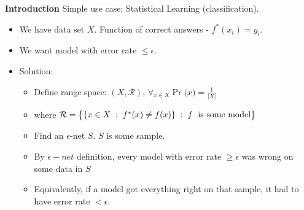 \documentclass{beamer}
\begin{document}
\begin{frame}{\textbf{Introduction}}
  Simple use case: Statistical Learning (classification).
  \begin{itemize}
    \item We have data set $X$. Function of correct answers - $f^*(x_i)=y_i$.
    \item We want model with error rate $\leq\epsilon$.
    \item Solution:
    \begin{itemize}
        \item Define range space: \( (X,\mathcal{R}) \), $\forall_{x \in X}\Pr \bigl( x\bigr) = \frac{1}{|X|}$
        \item where \(\mathcal{R} = \bigl \{ \{ x \in X \hspace{0.1cm} : \hspace{0.1cm} f^*(x) \neq f(x) \}\hspace{0.1cm} : \hspace{0.1cm}f  \text{ \hspace{0.1cm}is some model} \bigr \}\)
        \item Find an $\epsilon$-net $S$. \hspace{0.2cm} $S$ is some sample.
        \item By $\epsilon-net$ definition, every model with error rate $\geq \epsilon$ was wrong on some data in $S$
        \item Equivalently, if a model got everything right on that sample, it had to have error rate $<\epsilon$. 
    \end{itemize}
\end{itemize}

\end{frame}
\end{document}
